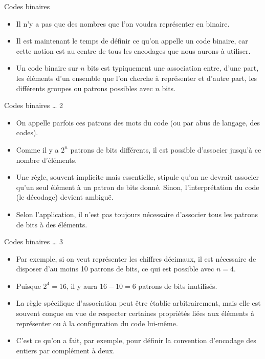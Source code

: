 \documentclass[presentation]{beamer}
\begin{document}
\begin{frame}[label={sec:orgdda86cc}]{Codes binaires}
\begin{itemize}
\item Il n'y a pas que des nombres que l'on voudra représenter en binaire.

\item Il est maintenant le temps de définir ce qu'on appelle un \alert{code binaire}, car cette notion est au centre de tous les encodages que nous aurons à utiliser.

\item Un code binaire sur \(n\) bits est typiquement une association entre, d'une part, les éléments d'un ensemble que l'on cherche à représenter et d'autre part, les différents groupes ou patrons possibles avec \(n\) bits.
\end{itemize}
\end{frame}

\begin{frame}[label={sec:org53c8f6c}]{Codes binaires \ldots{} 2}
\begin{itemize}
\item On appelle parfois ces patrons des mots du code (ou par abus de langage, des codes).

\item Comme il y a \(2^n\) patrons de bits différents, il est possible d'associer jusqu'à ce nombre d'éléments.

\item Une règle, souvent implicite mais essentielle, stipule qu'\alert{on ne devrait associer qu'un seul élément à un patron de bits donné.} Sinon, l'interprétation du code (le décodage) devient ambiguë.

\item Selon l'application, il n'est pas toujours nécessaire d'associer tous les patrons de bits à des éléments.
\end{itemize}
\end{frame}

\begin{frame}[label={sec:orge51aa2b}]{Codes binaires \ldots{} 3}
\begin{itemize}
\item Par exemple, si on veut représenter les chiffres décimaux, il est nécessaire de disposer d'au moins 10 patrons de bits, ce qui est possible avec \(n=4\).

\item Puisque \(2^4 = 16\), il y aura \(16 - 10 = 6\) patrons de bits inutilisés.

\item La règle spécifique d'association peut être établie arbitrairement, mais elle est souvent conçue en vue de respecter certaines propriétés liées aux éléments à représenter ou à la configuration du code lui-même.

\item C'est ce qu'on a fait, par exemple, pour définir la convention d'encodage des entiers par complément à deux.
\end{itemize}
\end{frame}
\end{document}
